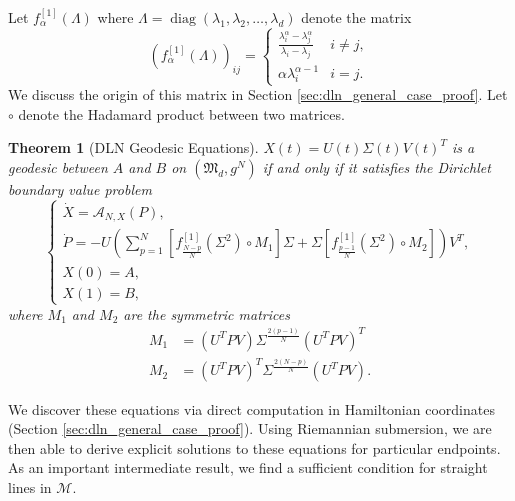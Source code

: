 \documentclass{amsart}
\DeclareMathOperator{\diag}{diag}
\newtheorem{theorem}{Theorem}[section]
\theoremstyle{definition}
\theoremstyle{remark}
\numberwithin{equation}{section}
\begin{document}
Let $f_\alpha^{[1]}(\Lambda)$ where $\Lambda = \diag(\lambda_1, \lambda_2, \ldots, \lambda_d)$ denote the matrix
\begin{equation}\label{eq:derivative_kernel_alpha}
    \left(f_{\alpha}^{[1]}(\Lambda)\right)_{ij} = \begin{cases}
        \frac{\lambda_i^{\alpha} - \lambda_j^{\alpha}}{\lambda_i - \lambda_j} &  i \neq j, \\
        \alpha \lambda_i^{\alpha - 1} &  i = j.
    \end{cases}
\end{equation}
We discuss the origin of this matrix in Section \ref{sec:dln_general_case_proof}. Let $\circ$ denote the Hadamard product between two matrices.
\begin{theorem}[DLN Geodesic Equations]\label{thm:dln_general_case}
    $X(t) = U(t)\Sigma(t)V(t)^T$ is a geodesic between $A$ and $B$ on $(\mathfrak{M}_d, g^N)$ if and only if it satisfies the Dirichlet boundary value problem
    \begin{equation}
        \begin{cases}
            \dot{X} = \mathcal{A}_{N,X}(P), \\
            \dot{P} = -U \left(\sum_{p=1}^N \left[f_{\frac{N-p}{N}}^{[1]}\left(\Sigma^2\right) \circ M_1\right] \Sigma + \Sigma\left[f_\frac{p-1}{N}^{[1]}\left(\Sigma^2\right) \circ M_2\right]\right) V^T,        \\
            X(0) = A, \\
            X(1) = B,
        \end{cases}
    \end{equation}
    where $M_1$ and $M_2$ are the symmetric matrices
    \begin{align}\label{eq:m1_and_m2}
    M_1 &= (U^TPV)\Sigma^\frac{2(p-1)}{N}(U^TPV)^T \\
    M_2 &= (U^TPV)^T \Sigma^{\frac{2(N-p)}{N}}(U^TPV).
    \end{align}
\end{theorem}
We discover these equations via direct computation in Hamiltonian coordinates (Section \ref{sec:dln_general_case_proof}). Using Riemannian submersion, we are then able to derive explicit solutions to these equations for particular endpoints. As an important intermediate result, we find a sufficient condition for straight lines in $\mathcal{M}$.
\end{document}
